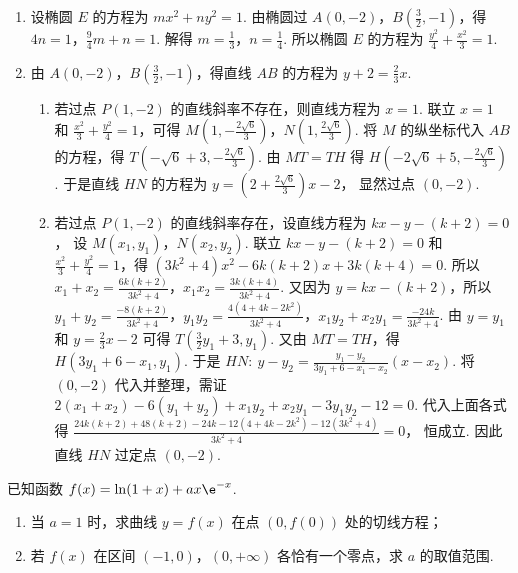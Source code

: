 \begin{solution}
\begin{enumerate}
\item 设椭圆 \(E\) 的方程为
\(mx^2+ny^2=1\).
由椭圆过 \(A(0,-2)\)，\(B\left( \frac{3}{2},-1 \right)\)，得 \(4n=1\)，\(\frac{9}{4}m+n=1\).
解得
\(m=\frac{1}{3}\)，\(n=\frac{1}{4}\).
所以椭圆 \(E\) 的方程为
\(\frac{y^2}{4}+\frac{x^2}{3}=1\).

\item 由 \(A(0,-2)\)，\(B\left( \frac{3}{2},-1 \right)\)，得直线 \(AB\) 的方程为
\(y+2=\frac{2}{3}x\).
\begin{enumerate}
\item 若过点 \(P(1,-2)\) 的直线斜率不存在，则直线方程为
\(x=1\).
联立 \(x=1\) 和 \(\frac{x^2}{3}+\frac{y^2}{4}=1\)，可得
\(M\left( 1,-\frac{2\sqrt{6}}{3} \right)\)，\(N\left( 1,\frac{2\sqrt{6}}{3} \right)\).
将 \(M\) 的纵坐标代入 \(AB\) 的方程，得
\(T\left( -\sqrt{6}+3,-\frac{2\sqrt{6}}{3} \right)\).
由 \(MT=TH\) 得
\(H\left( -2\sqrt{6}+5,-\frac{2\sqrt{6}}{3} \right)\).
于是直线 \(HN\) 的方程为
\(y=\left( 2+\frac{2\sqrt{6}}{3} \right)x-2\)，
显然过点 \((0,-2)\).

\item 若过点 \(P(1,-2)\) 的直线斜率存在，设直线方程为
\(kx-y-(k+2)=0\)，
设
\(M(x_1,y_1)\)，\(N(x_2,y_2)\).
联立 \(kx-y-(k+2)=0\) 和 \(\frac{x^2}{3}+\frac{y^2}{4}=1\)，得
\(\left( 3k^2+4 \right)x^2-6k(k+2)x+3k(k+4)=0\).
所以 \(x_1+x_2=\frac{6k(k+2)}{3k^2+4}\)，\(x_1x_2=\frac{3k(k+4)}{3k^2+4}\).
又因为 \(y=kx-(k+2)\)，所以 \(y_1+y_2=\frac{-8(k+2)}{3k^2+4}\)，\(y_1y_2=\frac{4(4+4k-2k^2)}{3k^2+4}\)，\(x_1y_2+x_2y_1=\frac{-24k}{3k^2+4}\).
由 \(y=y_1\) 和 \(y=\frac{2}{3}x-2\)
可得
\(T\left( \frac{3}{2}y_1+3,y_1 \right)\).
又由 \(MT=TH\)，得
\(H\left( 3y_1+6-x_1,y_1 \right)\).
于是
\(HN:\ y-y_2=\frac{y_1-y_2}{3y_1+6-x_1-x_2}(x-x_2)\).
将 \((0,-2)\) 代入并整理，需证 \(2(x_1+x_2)-6(y_1+y_2)+x_1y_2+x_2y_1-3y_1y_2-12=0\).
代入上面各式得 \(\frac{24k(k+2)+48(k+2)-24k-12(4+4k-2k^2)-12(3k^2+4)}{3k^2+4}=0\)，
恒成立.
因此直线 \(HN\) 过定点
\((0,-2)\).
\end{enumerate}
\end{enumerate}
\end{solution}

\begin{problem}
已知函数 \(f(x)=\ln(1+x)+ax\e^{-x}\).
\begin{enumerate}
\item 当 \(a=1\) 时，求曲线 \(y=f(x)\) 在点 \(\left( 0,f(0) \right)\) 处的切线方程；
\item 若 \(f(x)\) 在区间 \((-1,0)\)，\((0,+\infty)\) 各恰有一个零点，求 \(a\) 的取值范围.
\end{enumerate}
\end{problem}

